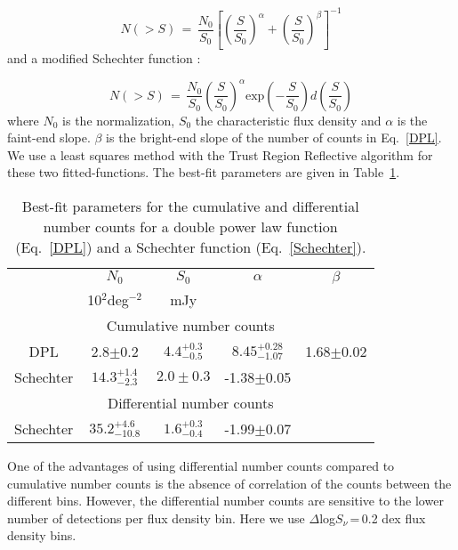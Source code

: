 \documentclass[longauth]{aa}
\begin{document}
\begin{equation}
\label{DPL}
N(>S)\,=\,\frac{N_0}{S_0}\left[ \left( \frac{S}{S_0} \right) ^\alpha + \left( \frac{S}{S_0} \right) ^\beta  \right]^{-1}
\end{equation}
and a modified Schechter \citep{Schechter1976} function \citep[e.g.][]{Knudsen2008}:

\begin{equation}
\label{Schechter}
N(>S) \,=\,\frac{N_0}{S_0} \left( \frac{S}{S_0} \right) ^\alpha \text{exp}\left( -\frac{S}{S_0} \right) d\left( \frac{S}{S_0} \right)
\end{equation}
\noindent where $N_0$ is the normalization, $S_0$ the characteristic flux density and $\alpha$ is the faint-end slope. $\beta$ is the bright-end slope of the number of counts in Eq.~\ref{DPL}. We use a least squares method with the Trust Region Reflective algorithm for these two fitted-functions. The best-fit parameters are given in Table~\ref{best_fit_powerlaw_shechter}.

\begin{table}
\centering          
\begin{tabular}{c c c c c }   
\hline    

			& $N_0$ 					& $S_0$				& $\alpha$				&$\beta$\\
          		& 10$^{2}$deg$^{-2}$		&mJy				&						&		\\
\hline    
\hline    
\multicolumn{5}{c}{Cumulative number counts}\\
DPL			&	2.8$\pm$0.2			&	$4.4_{-0.5}^{+0.3}$	&	$8.45_{-1.07}^{+0.28}$	&1.68$\pm$0.02\\
Schechter 	&	$14.3_{-2.3}^{+1.4}$		&	$2.0\pm0.3$		&	-1.38$\pm$0.05			&\\
\hline 
\multicolumn{5}{c}{Differential number counts}\\
Schechter 	&	$35.2_{-10.8}^{+4.6}$	&	$1.6_{-0.4}^{+0.3}$	&	-1.99$\pm$0.07			&\\
\hline
   \end{tabular}
\caption{Best-fit parameters for the cumulative and differential  number counts for a double power law function (Eq.~\ref{DPL}) and a Schechter function (Eq.~\ref{Schechter}).}
\label{best_fit_powerlaw_shechter}    

\end{table}




One of the advantages of using differential number counts compared to cumulative number counts is the absence of correlation of the counts between the different bins. However, the differential number counts are sensitive to the lower number of detections per flux density bin. Here we use $\Delta$log$S_\nu$\,=\,0.2 dex flux density bins.
\end{document}
